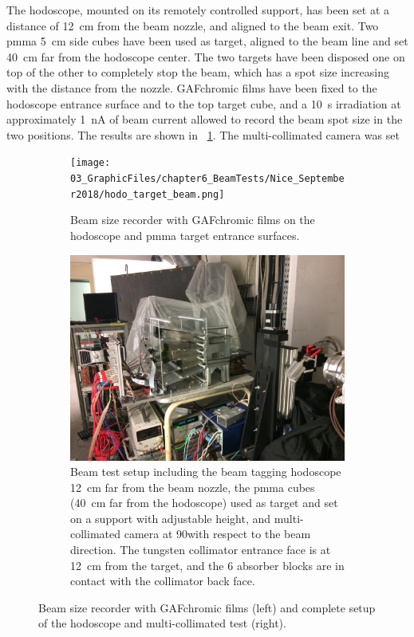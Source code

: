 The hodoscope, mounted on its remotely controlled support, has been set at a distance of 12~cm from the beam nozzle, and aligned to the beam exit. Two \gls{pmma} 5~cm side cubes have been used as target, aligned to the beam line and set 40~cm far from the hodoscope center. The two targets have been disposed one on top of the other to completely stop the beam, which has a spot size increasing with the distance from the nozzle. GAFchromic films have been fixed to the hodoscope entrance surface and to the top target cube, and a 10~s irradiation at approximately 1~nA of beam current allowed to record the beam spot size in the two positions. The results are shown in \figurename~\ref{chap6::fig::September_beamSize}.  The multi-collimated camera was set 

\begin{figure}[!htbp]
\begin{subfigure}[t]{.5\textwidth}
\centering
\texttt{[image: 03\_GraphicFiles/chapter6\_BeamTests/Nice\_September2018/hodo\_target\_beam.png]}
\caption{Beam size recorder with GAFchromic films on the hodoscope and \gls{pmma} target entrance surfaces.}
\label{chap6::fig::September_beamSize}
\end{subfigure}
\begin{subfigure}[t]{.5\textwidth}
\centering
\includegraphics[width=1.\textwidth]{03_GraphicFiles/chapter6_BeamTests/Nice_September2018/Setup_withColl_withHodo.jpg}	
\caption{Beam test setup including the beam tagging hodoscope 12~cm far from the beam nozzle, the \gls{pmma} cubes (40~cm far from the hodoscope) used as target and set on a support with adjustable height, and multi-collimated camera at 90\textdegree with respect to the beam direction. The tungsten collimator entrance face is at 12~cm from the target, and the 6 absorber blocks are in contact with the collimator back face.}
\label{chap6::fig::September_SetupPicture2}
\end{subfigure}
\caption{Beam size recorder with GAFchromic films (left) and complete setup of the hodoscope and multi-collimated test (right).}
\label{chap6::fig::September_SetupCamera}
\end{figure}

